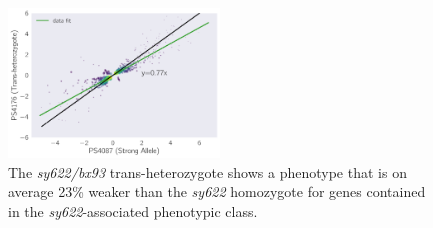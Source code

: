\documentclass[10pt, onecolumn]{article}
\begin{document}
\begin{figure}
  \centering{}
  \includegraphics[width=0.5\textwidth]{../figs/transhet_vs_strong.pdf}
  \caption{
  The \emph{sy622/bx93} trans-heterozygote shows a phenotype that is on average
  23\% weaker than the \emph{sy622} homozygote for genes contained in the
  \emph{sy622}-associated phenotypic class.
  }
\label{fig:transhet_strong_allele}
\end{figure}
\end{document}
